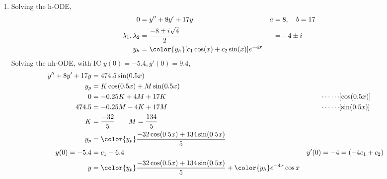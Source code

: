 \begin{enumerate}
    \item Solving the h-ODE,
          \begin{align}
              0                        & = y'' + 8y' + 17y                                  & a & = 8, \quad b = 17 \\
              \lambda_{1}, \lambda_{2} & = \frac{-8 \pm i\sqrt{4}}{2}                       &   & = -4 \pm i        \\
              y_{h}                    & = \color{y_h} [c_{1}\cos(x) + c_{2}\sin(x)]e^{-4x}
          \end{align}
          Solving the nh-ODE, with IC $ y(0) = -5.4, y'(0) = 9.4 $,
          \begin{align}
              y'' + 8y' + 17y & = 474.5\sin(0.5x)                                                                                                          \\
              y_{p}           & = K\cos(0.5x) + M\sin(0.5x)                                                                                                \\
              0               & = -0.25K + 4M + 17K                                                                   & \cdots\cdots & [\cos(0.5x)]        \\
              474.5           & = -0.25M - 4K + 17M                                                                   & \cdots\cdots & [\sin(0.5x)]        \\
              K               & = \frac{-32}{5} \qquad M = \frac{134}{5}                                                                                   \\
              y_{p}           & = \color{y_p} \frac{-32\cos(0.5x) + 134\sin(0.5x)}{5}                                                                      \\
              y(0) = -5.4     & = c_{1} - 6.4                                                                         & y'(0) = -4   & = (-4c_{1} + c_{2}) \\
              y               & = {\color{y_p} \frac{-32\cos(0.5x) + 134\sin(0.5x)}{5}} + {\color{y_h} e^{-4x}\cos x}
          \end{align}


\end{enumerate}
